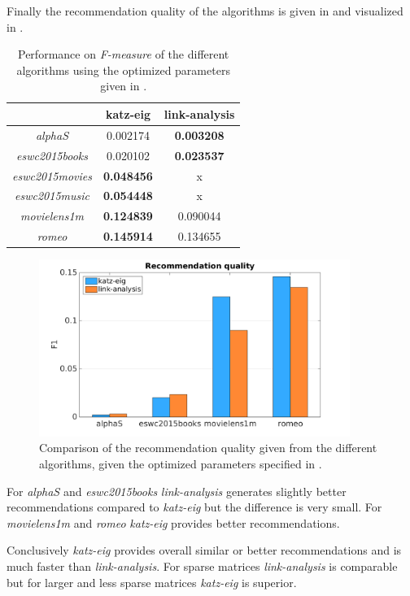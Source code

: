 Finally the recommendation quality of the algorithms is given in  and visualized in .


\begin{table}[h!]
    \centering
    \begin{tabular}{| c | c | c | }
        \hline
        \textbf{}               & \textbf{katz-eig} & \textbf{link-analysis} \\ \hline
        \textit{alphaS}         & 0.002174          & \textbf{0.003208}      \\ \hline
        \textit{eswc2015books}  & 0.020102          & \textbf{0.023537}      \\ \hline
        \textit{eswc2015movies} & \textbf{0.048456} & x                      \\ \hline
        \textit{eswc2015music}  & \textbf{0.054448} & x                      \\ \hline
        \textit{movielens1m}    & \textbf{0.124839} & 0.090044               \\ \hline
        \textit{romeo}          & \textbf{0.145914} & 0.134655               \\ \hline
    \end{tabular}
    \caption{Performance on \textit{F-measure} of the different algorithms using the optimized parameters given in .}
    \label{tab:alg_full_perf}
\end{table}

\begin{figure}[h!]
    \centering
    \includegraphics[width=0.9\textwidth]{fig/comp/comp_rec_quality.png}
    \caption{Comparison of the recommendation quality given from the different algorithms, given the optimized parameters specified in .}
    \label{fig:alg_comp_perf}
\end{figure}

For \textit{alphaS} and \textit{eswc2015books} \textit{link-analysis} generates slightly better recommendations compared to \textit{katz-eig} but the difference is very small. For \textit{movielens1m} and \textit{romeo} \textit{katz-eig} provides better recommendations.

Conclusively \textit{katz-eig} provides overall similar or better recommendations and is much faster than \textit{link-analysis}. For sparse matrices \textit{link-analysis} is comparable but for larger and less sparse matrices \textit{katz-eig} is superior.

